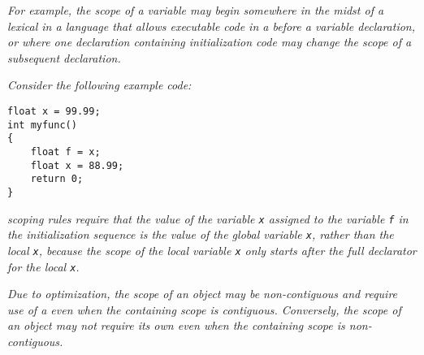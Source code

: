 \textit{For example, the scope of a variable may begin somewhere 
in the midst of a lexical  in a 
language that allows executable code in a
 before a variable declaration, or where one declaration
containing initialization code may change the scope of a
subsequent declaration.}  

\textit{Consider the following example  code:}
\vspace{3mm}
\begin{lstlisting}
float x = 99.99;
int myfunc()
{
    float f = x;
    float x = 88.99;
    return 0;
}
\end{lstlisting}

\textit{ scoping rules require that the value of the 
variable \texttt{x} assigned to the variable \texttt{f} in the 
initialization sequence is the value of the global variable \texttt{x}, 
rather than the local \texttt{x}, because the scope of the local variable 
\texttt{x} only starts after the full declarator for the local \texttt{x}.}

\textit{Due to optimization, the scope of an object may be
non-contiguous and require use of a  even when
the containing scope is contiguous. Conversely, the scope of
an object may not require its own  even when the
containing scope is non-contiguous.}
